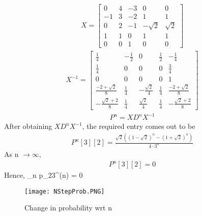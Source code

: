 \documentclass[journal,12pt,twocolumn]{IEEEtran}
\begin{document}
\begin{align}
    X = \left[\begin{array}{ccccc}0 & 4 & -3 & 0 & 0\\-1 & 3 & -2 & 1 & 1\\0 & 2 & -1 & - \sqrt{2} & \sqrt{2}\\1 & 1 & 0 & 1 & 1\\0 & 0 & 1 & 0 & 0\end{array}\right]
\end{align}
\begin{align}
    X^{-1} = \left[\begin{array}{ccccc}\frac{1}{4} & - \frac{1}{2} & 0 & \frac{1}{2} & - \frac{1}{4}\\\frac{1}{4} & 0 & 0 & 0 & \frac{3}{4}\\0 & 0 & 0 & 0 & 1\\\frac{-2 + \sqrt{2}}{8} & \frac{1}{4} & - \frac{\sqrt{2}}{4} & \frac{1}{4} & \frac{-2 + \sqrt{2}}{8}\\- \frac{\sqrt{2} + 2}{8} & \frac{1}{4} & \frac{\sqrt{2}}{4} & \frac{1}{4} & - \frac{\sqrt{2} + 2}{8}\end{array}\right]
\end{align}
\begin{align}
    P^{n} = X D^{n}X^{-1}
\end{align}
After obtaining $X D^{n}X^{-1}$, the required entry comes out to be
\begin{align}
    P^{n}[3][2] = \frac{\sqrt{2}\left(\left(1 - \sqrt{2}\right)^{n} - \left(1 + \sqrt{2}\right)^{n}\right)}{4\cdot3^{n}} 
\end{align}
As n $\rightarrow\infty$,
\begin{align}
    P^{n}[3][2] = 0
\end{align}
Hence,
  \lim _{n \rightarrow \infty} p_{23}^{(n)} = 0 
\begin{figure}[!ht]
\centering
         \texttt{[image: NStepProb.PNG]}
         \caption{Change in probability wrt n}
         \label{Figure}
\end{figure}
\end{document}
